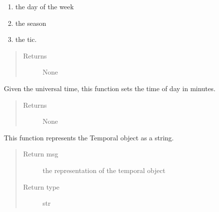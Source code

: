 \documentclass[letterpaper,10pt,english]{sphinxmanual}
\begin{document}
\begin{fulllineitems}
\begin{fulllineitems}
\begin{enumerate}
\item {} 
the day of the week

\item {} 
the season

\item {} 
the tic.

\end{enumerate}
\begin{quote}\begin{description}
\item[{Returns}] \leavevmode
None

\end{description}\end{quote}

\end{fulllineitems}


\begin{fulllineitems}
\label{temporal:temporal.Temporal.set_time_of_day}
Given the universal time, this function sets the time of day in minutes.
\begin{quote}\begin{description}
\item[{Returns}] \leavevmode
None

\end{description}\end{quote}

\end{fulllineitems}


\begin{fulllineitems}
\label{temporal:temporal.Temporal.toString}
This function represents the Temporal object as a string.
\begin{quote}\begin{description}
\item[{Return msg}] \leavevmode
the representation of the temporal object

\item[{Return type}] \leavevmode
str

\end{description}\end{quote}

\end{fulllineitems}


\end{fulllineitems}
\end{document}
